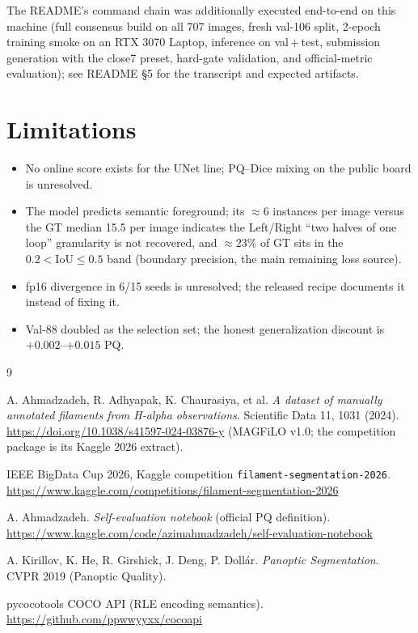 \documentclass[11pt]{article}
\newcommand{\IoU}{\mathrm{IoU}}
\begin{document}
The README's command chain was additionally executed end-to-end on this
machine (full consensus build on all 707 images, fresh val-106 split,
2-epoch training smoke on an RTX 3070 Laptop, inference on
val\,+\,test, submission generation with the close7 preset, hard-gate
validation, and official-metric evaluation); see README \S5 for the
transcript and expected artifacts.

\section{Limitations}
\begin{itemize}
\item No online score exists for the UNet line; PQ--Dice mixing on the
      public board is unresolved.
\item The model predicts semantic foreground; its $\approx6$ instances per
      image versus the GT median 15.5 per image indicates the
      Left/Right ``two halves of one loop'' granularity is not recovered,
      and $\approx23\%$ of GT sits in the $0.2<\IoU\le0.5$ band
      (boundary precision, the main remaining loss source).
\item fp16 divergence in 6/15 seeds is unresolved; the released recipe
      documents it instead of fixing it.
\item Val-88 doubled as the selection set; the honest generalization
      discount is $+0.002$--$+0.015$ PQ.
\end{itemize}

\begin{thebibliography}{9}

A. Ahmadzadeh, R. Adhyapak, K. Chaurasiya, et al.
\emph{A dataset of manually annotated filaments from H-alpha observations}.
Scientific Data 11, 1031 (2024).
\url{https://doi.org/10.1038/s41597-024-03876-y}
(MAGFiLO v1.0; the competition package is its Kaggle 2026 extract).

IEEE BigData Cup 2026, Kaggle competition
\texttt{filament-segmentation-2026}.
\url{https://www.kaggle.com/competitions/filament-segmentation-2026}

A. Ahmadzadeh. \emph{Self-evaluation notebook} (official PQ definition).
\url{https://www.kaggle.com/code/azimahmadzadeh/self-evaluation-notebook}

A. Kirillov, K. He, R. Girshick, J. Deng, P. Doll\'ar.
\emph{Panoptic Segmentation}. CVPR 2019 (Panoptic Quality).

pycocotools COCO API (RLE encoding semantics).
\url{https://github.com/ppwwyyxx/cocoapi}

\end{thebibliography}
\end{document}
